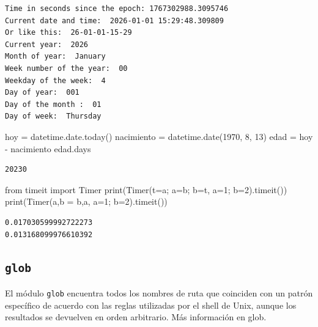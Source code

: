 \documentclass[
  spanish,
  letterpaper,
]{scrbook}
\newenvironment{Shaded}{\begin{snugshade}}{\end{snugshade}}
\newcommand{\BuiltInTok}[1]{\textcolor[rgb]{0.00,0.23,0.31}{#1}}
\newcommand{\DecValTok}[1]{\textcolor[rgb]{0.68,0.00,0.00}{#1}}
\newcommand{\ImportTok}[1]{\textcolor[rgb]{0.00,0.46,0.62}{#1}}
\newcommand{\NormalTok}[1]{\textcolor[rgb]{0.00,0.23,0.31}{#1}}
\newcommand{\OperatorTok}[1]{\textcolor[rgb]{0.37,0.37,0.37}{#1}}
\newcommand{\StringTok}[1]{\textcolor[rgb]{0.13,0.47,0.30}{#1}}
\theoremstyle{definition}
\theoremstyle{remark}
\begin{document}
\begin{verbatim}
Time in seconds since the epoch: 1767302988.3095746
Current date and time:  2026-01-01 15:29:48.309809
Or like this:  26-01-01-15-29
Current year:  2026
Month of year:  January
Week number of the year:  00
Weekday of the week:  4
Day of year:  001
Day of the month :  01
Day of week:  Thursday
\end{verbatim}

\begin{Shaded}
\begin{Highlighting}[]
\NormalTok{hoy }\OperatorTok{=}\NormalTok{ datetime.date.today()}
\NormalTok{nacimiento }\OperatorTok{=}\NormalTok{ datetime.date(}\DecValTok{1970}\NormalTok{, }\DecValTok{8}\NormalTok{, }\DecValTok{13}\NormalTok{)}
\NormalTok{edad }\OperatorTok{=}\NormalTok{ hoy }\OperatorTok{{-}}\NormalTok{ nacimiento}
\NormalTok{edad.days}
\end{Highlighting}
\end{Shaded}

\begin{verbatim}
20230
\end{verbatim}

\begin{Shaded}
\begin{Highlighting}[]
\ImportTok{from}\NormalTok{ timeit }\ImportTok{import}\NormalTok{ Timer}
\BuiltInTok{print}\NormalTok{(Timer(}\StringTok{\textquotesingle{}t=a; a=b; b=t\textquotesingle{}}\NormalTok{, }\StringTok{\textquotesingle{}a=1; b=2\textquotesingle{}}\NormalTok{).timeit())}
\BuiltInTok{print}\NormalTok{(Timer(}\StringTok{\textquotesingle{}a,b = b,a\textquotesingle{}}\NormalTok{, }\StringTok{\textquotesingle{}a=1; b=2\textquotesingle{}}\NormalTok{).timeit())}
\end{Highlighting}
\end{Shaded}

\begin{verbatim}
0.017030599992722273
0.013168099976610392
\end{verbatim}

\subsection{\texorpdfstring{\texttt{glob}}{glob}}\label{glob}

El módulo \texttt{glob} encuentra todos los nombres de ruta que
coinciden con un patrón específico de acuerdo con las reglas utilizadas
por el shell de Unix, aunque los resultados se devuelven en orden
arbitrario. Más información en glob.
\end{document}

